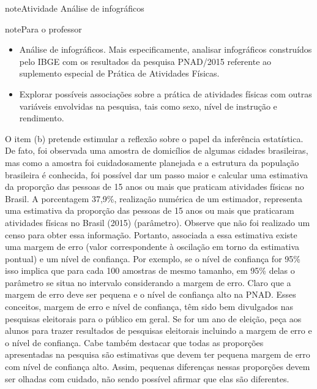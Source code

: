 \begin{sphinxadmonition}{note}{Atividade}{ Análise de infográficos}

\begin{sphinxadmonition}{note}{Para o professor}

\begin{itemize}
\item {} 
Análise de infográficos. Mais especificamente, analisar infográficos construídos pelo IBGE com os resultados da pesquisa PNAD/2015 referente ao suplemento especial de Prática de Atividades Físicas.

\item {} 
Explorar possíveis associações sobre a prática de atividades físicas com outras variáveis envolvidas na pesquisa, tais como sexo, nível de instrução e rendimento.

\end{itemize}



O item (b) pretende estimular a reflexão sobre o papel da inferência estatística. De fato, foi observada uma amostra de domicílios de algumas cidades brasileiras, mas como a amostra foi cuidadosamente planejada e a estrutura da população brasileira é conhecida, foi possível dar um passo maior e calcular uma estimativa da proporção das pessoas de 15 anos ou mais que praticam atividades físicas no Brasil. A porcentagem 37,9\%, realização numérica de um estimador, representa uma estimativa da proporção das pessoas de 15 anos ou mais que praticaram atividades físicas no Brasil (2015) (parâmetro). Observe que não foi realizado um censo para obter essa informação. Portanto, associada a essa estimativa existe uma margem de erro (valor correspondente à oscilação em torno da estimativa pontual) e um nível de confiança. Por exemplo, se o nível de confiança for 95\% isso implica que para cada 100 amostras de mesmo tamanho, em 95\% delas o parâmetro se situa no intervalo considerando a margem de erro. Claro que a margem de erro deve ser pequena e o nível de confiança alto na PNAD. Esses conceitos, margem de erro e nível de confiança, têm sido bem divulgados nas pesquisas eleitorais para o público em geral. Se for um ano de eleição, peça aos alunos para trazer resultados de pesquisas eleitorais incluindo a margem de erro e o nível de confiança.
Cabe também destacar que todas as proporções apresentadas na pesquisa são estimativas que devem ter pequena margem de erro com nível de confiança alto. Assim, pequenas diferenças nessas proporções devem ser olhadas com cuidado, não sendo possível afirmar que elas são diferentes.


\end{sphinxadmonition}
\end{sphinxadmonition}
